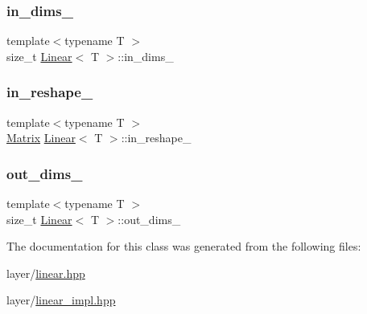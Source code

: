 \subsubsection{\texorpdfstring{in\_dims\_}{in\_dims\_}}
{\footnotesize\ttfamily template$<$typename T $>$ \\
size\+\_\+t \mbox{\hyperlink{class_linear}{Linear}}$<$ T $>$\+::in\+\_\+dims\+\_\+\hspace{0.3cm}{\ttfamily [protected]}}

\mbox{\label{class_linear_a52fbc58c45b62d75089fc627c5210455}} 
\subsubsection{\texorpdfstring{in\_reshape\_}{in\_reshape\_}}
{\footnotesize\ttfamily template$<$typename T $>$ \\
\mbox{\hyperlink{class_layer_a22b1e7286096aa62bd245536c8ebdaf1}{Matrix}} \mbox{\hyperlink{class_linear}{Linear}}$<$ T $>$\+::in\+\_\+reshape\+\_\+\hspace{0.3cm}{\ttfamily [protected]}}

\mbox{\label{class_linear_affb0e56f0ca748a62e4aa5ce5733b491}} 
\subsubsection{\texorpdfstring{out\_dims\_}{out\_dims\_}}
{\footnotesize\ttfamily template$<$typename T $>$ \\
size\+\_\+t \mbox{\hyperlink{class_linear}{Linear}}$<$ T $>$\+::out\+\_\+dims\+\_\+\hspace{0.3cm}{\ttfamily [protected]}}



The documentation for this class was generated from the following files\+:\begin{DoxyCompactItemize}
\item 
layer/\mbox{\hyperlink{linear_8hpp}{linear.\+hpp}}\item 
layer/\mbox{\hyperlink{linear__impl_8hpp}{linear\+\_\+impl.\+hpp}}\end{DoxyCompactItemize}
